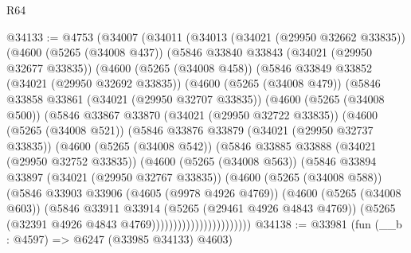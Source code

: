 \begin{lexlean}{R64}
\begin{coremodule}
@34133 := @4753
    (@34007
      (@34011
        (@34013
          (@34021 (@29950 @32662 @33835))
          (@4600
            (@5265 (@34008 @437))
            (@5846
              @33840
              @33843
              (@34021 (@29950 @32677 @33835))
              (@4600
                (@5265 (@34008 @458))
                (@5846
                  @33849
                  @33852
                  (@34021 (@29950 @32692 @33835))
                  (@4600
                    (@5265 (@34008 @479))
                    (@5846
                      @33858
                      @33861
                      (@34021 (@29950 @32707 @33835))
                      (@4600
                        (@5265 (@34008 @500))
                        (@5846
                          @33867
                          @33870
                          (@34021 (@29950 @32722 @33835))
                          (@4600
                            (@5265 (@34008 @521))
                            (@5846
                              @33876
                              @33879
                              (@34021 (@29950 @32737 @33835))
                              (@4600
                                (@5265 (@34008 @542))
                                (@5846
                                  @33885
                                  @33888
                                  (@34021 (@29950 @32752 @33835))
                                  (@4600
                                    (@5265 (@34008 @563))
                                    (@5846
                                      @33894
                                      @33897
                                      (@34021 (@29950 @32767 @33835))
                                      (@4600
                                        (@5265 (@34008 @588))
                                        (@5846
                                          @33903
                                          @33906
                                          (@4605 (@9978 @4926 @4769))
                                          (@4600
                                            (@5265 (@34008 @603))
                                            (@5846
                                              @33911
                                              @33914
                                              (@5265 (@29461 @4926 @4843 @4769))
                                              (@5265
                                                (@32391 @4926 @4843 @4769)))))))))))))))))))))))
@34138 := @33981 (fun (__b : @4597) => @6247 (@33985 @34133) @4603)

\end{coremodule}
\end{lexlean}

